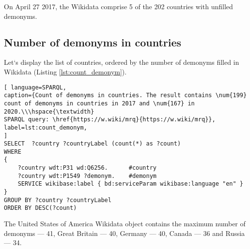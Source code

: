 
On April 27 2017, the Wikidata comprise 5 of the 202 countries with unfilled demonyms.

\subsection{Number of demonyms in countries}

Let`s display the list of countries, ordered by the number of demonyms filled in Wikidata (Listing \ref{lst:count_demonym}).

\begin{lstlisting}[ language=SPARQL, 
caption={Count of demonyms in countries. The result contains \num{199} count of demonyms in countries in 2017 and \num{167} in 2020.\\\hspace{\textwidth}
SPARQL query: \href{https://w.wiki/mrq}{https://w.wiki/mrq}},
label=lst:count_demonym, 
]
SELECT  ?country ?countryLabel (count(*) as ?count)
WHERE
{
	?country wdt:P31 wd:Q6256.      #country
	?country wdt:P1549 ?demonym.    #demonym
	SERVICE wikibase:label { bd:serviceParam wikibase:language "en" }
}
GROUP BY ?country ?countryLabel 
ORDER BY DESC(?count)
\end{lstlisting}



The United States of America Wikidata object contains the maximum number of demonyms --- 41, Great Britain --- 40, Germany --- 40, Canada --- 36 and Russia --- 34.

